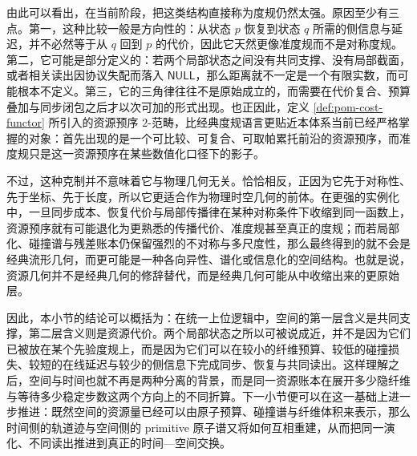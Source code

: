 由此可以看出，在当前阶段，把这类结构直接称为度规仍然太强。原因至少有三点。第一，这种比较一般是方向性的：从状态 \(p\) 恢复到状态 \(q\) 所需的侧信息与延迟，并不必然等于从 \(q\) 回到 \(p\) 的代价，因此它天然更像准度规而不是对称度规。第二，它可能是部分定义的：若两个局部状态之间没有共同支撑、没有局部截面，或者相关读出因协议失配而落入 \(\mathsf{NULL}\)，那么距离就不一定是一个有限实数，而可能根本不定义。第三，它的三角律往往不是原始成立的，而需要在代价复合、预算叠加与同步闭包之后才以次可加的形式出现。也正因此，定义 \ref{def:pom-cost-functor} 所引入的资源预序 \(2\)-范畴，比经典度规语言更贴近本体系当前已经严格掌握的对象：首先出现的是一个可比较、可复合、可取帕累托前沿的资源预序，而准度规只是这一资源预序在某些数值化口径下的影子。

不过，这种克制并不意味着它与物理几何无关。恰恰相反，正因为它先于对称性、先于坐标、先于长度，所以它更适合作为物理时空几何的前体。在更强的实例化中，一旦同步成本、恢复代价与局部传播律在某种对称条件下收缩到同一函数上，资源预序就有可能退化为更熟悉的传播代价、准度规甚至真正的度规；而若局部化、碰撞谱与残差账本仍保留强烈的不对称与多尺度性，那么最终得到的就不会是经典流形几何，而更可能是一种各向异性、谱化或信息化的空间结构。也就是说，资源几何并不是经典几何的修辞替代，而是经典几何可能从中收缩出来的更原始层。

因此，本小节的结论可以概括为：在统一上位逻辑中，空间的第一层含义是共同支撑，第二层含义则是资源代价。两个局部状态之所以可被说成近，并不是因为它们已被放在某个先验度规上，而是因为它们可以在较小的纤维预算、较低的碰撞损失、较短的在线延迟与较少的侧信息下完成同步、恢复与共同读出。这样理解之后，空间与时间也就不再是两种分离的背景，而是同一资源账本在展开多少隐纤维与等待多少稳定步数这两个方向上的不同折算。下一小节便可以在这一基础上进一步推进：既然空间的资源量已经可以由原子预算、碰撞谱与纤维体积来表示，那么时间侧的轨道迹与空间侧的 primitive 原子谱又将如何互相重建，从而把同一演化、不同读出推进到真正的时间—空间交换。
